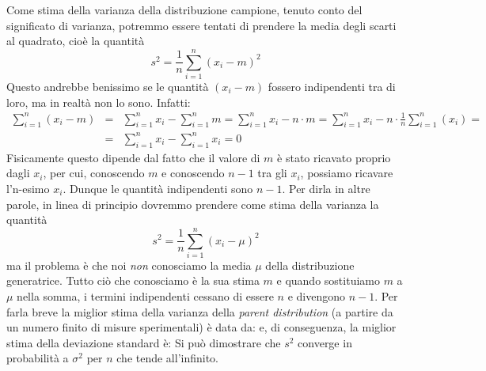 Come stima della varianza della distribuzione campione, tenuto conto del
significato di varianza, potremmo essere tentati di prendere
la media degli scarti al quadrato, cio\`e la quantit\`a
$$
s^2 = \frac{1}{n} \sum_{i=1}^n(x_i -m)^2
$$
Questo andrebbe benissimo se le quantit\`a $(x_i-m)$ fossero indipendenti
tra di loro, ma in realt\`a non lo sono. Infatti:
\begin{eqnarray*}
\sum_{i=1}^{n}(x_i-m) &=&
\sum_{i=1}^{n} x_i -\sum_{i=1}^{n} m =
\sum_{i=1}^{n} x_i - n\cdot m =
\sum_{i=1}^{n} x_i - n \cdot \frac{1}{n}\sum_{i=1}^{n}(x_i) =\\
& = & \sum_{i=1}^{n} x_i - \sum_{i=1}^{n} x_i = 0
\end{eqnarray*}
Fisicamente questo dipende dal fatto che il valore di $m$ \`e stato ricavato
proprio dagli $x_i$, per cui, conoscendo $m$ e conoscendo $n-1$ tra gli $x_i$,
possiamo ricavare l'n-esimo $x_i$. Dunque le quantit\`a indipendenti sono
$n-1$.
Per dirla in altre parole, in linea di principio dovremmo prendere
come stima della varianza la quantit\`a
$$
s^2 = \frac{1}{n} \sum_{i=1}^n(x_i - \mu)^2
$$
ma il problema \`e che noi {\itshape non} conosciamo la media $\mu$
della distribuzione generatrice. Tutto ci\`o che conosciamo \`e la sua
stima $m$ e quando sostituiamo $m$ a $\mu$ nella somma, i termini indipendenti
cessano di essere $n$ e divengono $n-1$.
Per farla breve la miglior stima della varianza della
\emph{parent distribution} (a partire da un numero finito di misure
sperimentali) \`e data da:
e, di conseguenza, la miglior stima della deviazione standard \`e:
Si pu\`o dimostrare che $s^2$ converge in
probabilit\`a a $\sigma^2$ per $n$ che tende all'infinito.

